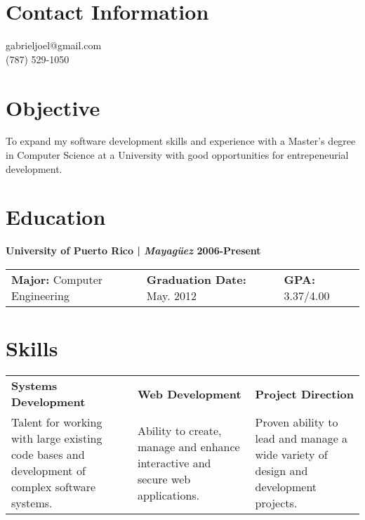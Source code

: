 \documentclass[margin,line]{res}
\begin{document}


\begin{resume}
\section{\sc Contact Information}
\vspace{.05in}
gabrieljoel@gmail.com \\
(787) 529-1050       



\section{\sc Objective}
To expand my software development skills and experience with a Master's degree in Computer Science at a University with good opportunities for entrepeneurial development.  

\section{\sc Education}

{\bf University of Puerto Rico | {\em Mayag\"uez } \hfill {\bf 2006-Present } }
\vspace{-.01cm}
\begin{tabular}{@{}p{2in}p{2in}p{2in}}
 {\bf Major:} Computer Engineering           & {\bf Graduation Date:} May. 2012  & {\bf GPA:} 3.37/4.00  \\            
\end{tabular}


\section{\sc Skills}
\begin{tabular}{@{}p{2in}p{2in}p{1.7in}}
{\bf Systems Development}             & {\bf Web Development}  & {\bf Project Direction} \\            
Talent for working with large existing code bases and development of complex software systems. & Ability to create, manage and enhance interactive and secure web applications. & Proven ability to lead and manage a wide variety of design and development projects.   
\end{tabular}



\end{resume}
\end{document}
